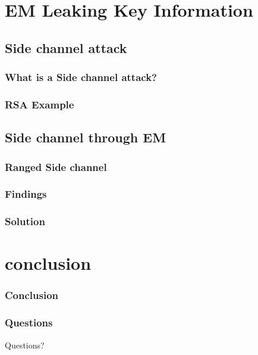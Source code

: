 \documentclass{beamer}
\begin{document}
\section{EM Leaking Key Information}
	\subsection{Side channel attack}
		\begin{frame}
		\frametitle{What is a Side channel attack?}
		\end{frame}
		\begin{frame}
		\frametitle{RSA Example}
		\end{frame}
	\subsection{Side channel through EM }
		\begin{frame}
		\frametitle{Ranged Side channel}
		\end{frame}
		
		\begin{frame}
		\frametitle{Findings}
		\end{frame}
		
		\begin{frame}
		\frametitle{Solution}
		\end{frame}
\section{conclusion}
	\begin{frame}
		\frametitle{Conclusion}
		\end{frame}	
		
		\begin{frame}
		\frametitle{Questions}
			\begin{center}
			\Huge Questions?
			\end{center}
		\end{frame}	
\end{document}
